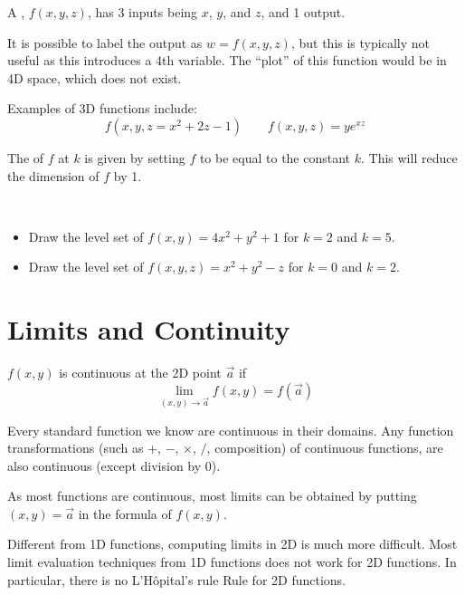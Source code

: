 \documentclass[11pt,fleqn]{book} %
\begin{document}
\begin{definition}[3D Function]
    A , $f(x, y, z)$, has 3 inputs being $x$, $y$, and $z$, and 1 output.
\end{definition}

It is possible to label the output as $w = f(x, y, z)$, but this is typically not useful as this introduces a 4th variable. The ``plot'' of this function would be in 4D space, which does not exist.

Examples of 3D functions include: $$f(x, y, z = x^2 + 2z - 1) \qquad f(x, y, z) = ye^{xz}$$

\begin{definition}
    The  of $f$ at $k$ is given by setting $f$ to be equal to the constant $k$. This will reduce the dimension of $f$ by 1.
\end{definition}

\begin{exercise}
    $\text{ }$

    \begin{itemize}
        \item Draw the level set of $f(x, y) = 4x^2 + y^2 + 1$ for $k = 2$ and $k = 5$.
        \item Draw the level set of $f(x, y, z) = x^2 + y^2 - z$ for $k = 0$ and $k = 2$.
    \end{itemize}
\end{exercise}

\section{Limits and Continuity}

$f(x, y)$ is continuous at the 2D point $\vec{a}$ if $$\lim_{(x, y) \to \vec{a}} f(x, y) = f(\vec{a})$$

Every standard function we know are continuous in their domains. Any function transformations (such as $+$, $-$, $\times$, $/$, composition) of continuous functions, are also continuous (except division by $0$).

As most functions are continuous, most limits can be obtained by putting $(x, y) = \vec{a}$ in the formula of $f(x,y)$.

Different from 1D functions, computing limits in 2D is much more difficult. Most limit evaluation techniques from 1D functions does not work for 2D functions. In particular, there is no L'Hôpital's rule Rule for 2D functions.
\end{document}
